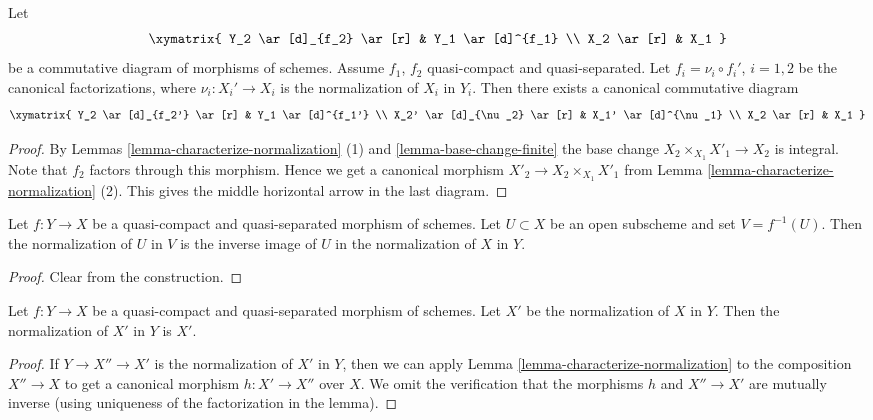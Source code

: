 \begin{lemma}
\label{lemma-functoriality-normalization}
Let
$$
\xymatrix{
Y_2 \ar[d]_{f_2} \ar[r] & Y_1 \ar[d]^{f_1} \\
X_2 \ar[r] & X_1
}
$$
be a commutative diagram of morphisms of schemes.
Assume $f_1$, $f_2$ quasi-compact and quasi-separated.
Let $f_i = \nu_i \circ f_i'$, $i = 1, 2$
be the canonical factorizations, where $\nu_i : X_i' \to X_i$ is
the normalization of $X_i$ in $Y_i$. Then there exists a
canonical commutative diagram
$$
\xymatrix{
Y_2 \ar[d]_{f_2'} \ar[r] & Y_1 \ar[d]^{f_1'} \\
X_2' \ar[d]_{\nu_2} \ar[r] & X_1' \ar[d]^{\nu_1} \\
X_2 \ar[r] & X_1
}
$$
\end{lemma}

\begin{proof}
By Lemmas \ref{lemma-characterize-normalization} (1)
and \ref{lemma-base-change-finite}
the base change $X_2 \times_{X_1} X'_1 \to X_2$
is integral. Note that $f_2$ factors through this morphism.
Hence we get a canonical morphism
$X'_2 \to X_2 \times_{X_1} X'_1$ from
Lemma \ref{lemma-characterize-normalization} (2).
This gives the middle horizontal arrow in the last diagram.
\end{proof}

\begin{lemma}
\label{lemma-normalization-localization}
Let $f : Y \to X$ be a quasi-compact and quasi-separated morphism of schemes.
Let $U \subset X$ be an open subscheme and set $V = f^{-1}(U)$.
Then the normalization of $U$ in $V$ is the inverse image of $U$
in the normalization of $X$ in $Y$.
\end{lemma}

\begin{proof}
Clear from the construction.
\end{proof}

\begin{lemma}
\label{lemma-normalization-is-normalization}
Let $f : Y \to X$ be a quasi-compact and quasi-separated morphism of schemes.
Let $X'$ be the normalization of $X$ in $Y$. Then the normalization of
$X'$ in $Y$ is $X'$.
\end{lemma}

\begin{proof}
If $Y \to X'' \to X'$ is the normalization of $X'$ in $Y$, then
we can apply Lemma \ref{lemma-characterize-normalization}
to the composition $X'' \to X$ to get a canonical morphism
$h : X' \to X''$ over $X$. We omit the verification that the
morphisms $h$ and $X'' \to X'$ are mutually inverse (using uniqueness
of the factorization in the lemma).
\end{proof}

